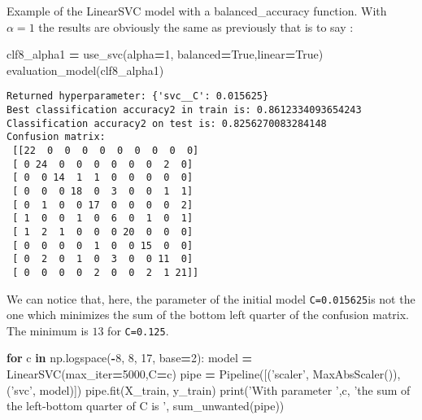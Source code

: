 \documentclass[10pt,a4paper]{article}
\newenvironment{Shaded}{\begin{snugshade}}{\end{snugshade}}
\newcommand{\BuiltInTok}[1]{#1}
\newcommand{\ControlFlowTok}[1]{\textcolor[rgb]{0.13,0.29,0.53}{\textbf{#1}}}
\newcommand{\DecValTok}[1]{\textcolor[rgb]{0.00,0.00,0.81}{#1}}
\newcommand{\KeywordTok}[1]{\textcolor[rgb]{0.13,0.29,0.53}{\textbf{#1}}}
\newcommand{\NormalTok}[1]{#1}
\newcommand{\OperatorTok}[1]{\textcolor[rgb]{0.81,0.36,0.00}{\textbf{#1}}}
\newcommand{\StringTok}[1]{\textcolor[rgb]{0.31,0.60,0.02}{#1}}
\newcommand{\VariableTok}[1]{\textcolor[rgb]{0.00,0.00,0.00}{#1}}
\theoremstyle{break}
\begin{document}
Example of the LinearSVC model with a balanced\_accuracy function. With \(\alpha = 1\) the results are obviously the same as previously that is to say :

\begin{Shaded}
\begin{Highlighting}[]
\NormalTok{clf8_alpha1 }\OperatorTok{=}\NormalTok{ use_svc(alpha}\OperatorTok{=}\DecValTok{1}\NormalTok{, balanced}\OperatorTok{=}\VariableTok{True}\NormalTok{,linear}\OperatorTok{=}\VariableTok{True}\NormalTok{)}
\NormalTok{evaluation_model(clf8_alpha1)}
\end{Highlighting}
\end{Shaded}

\begin{verbatim}
Returned hyperparameter: {'svc__C': 0.015625}
Best classification accuracy2 in train is: 0.8612334093654243
Classification accuracy2 on test is: 0.8256270083284148
Confusion matrix: 
 [[22  0  0  0  0  0  0  0  0  0]
 [ 0 24  0  0  0  0  0  0  2  0]
 [ 0  0 14  1  1  0  0  0  0  0]
 [ 0  0  0 18  0  3  0  0  1  1]
 [ 0  1  0  0 17  0  0  0  0  2]
 [ 1  0  0  1  0  6  0  1  0  1]
 [ 1  2  1  0  0  0 20  0  0  0]
 [ 0  0  0  0  1  0  0 15  0  0]
 [ 0  2  0  1  0  3  0  0 11  0]
 [ 0  0  0  0  2  0  0  2  1 21]]
\end{verbatim}

We can notice that, here, the parameter of the initial model \texttt{C=0.015625}is not the one which minimizes the sum of the bottom left quarter of the confusion matrix. The minimum is \(13\) for \texttt{C=0.125}.

\begin{Shaded}
\begin{Highlighting}[]
\ControlFlowTok{for}\NormalTok{ c }\KeywordTok{in}\NormalTok{ np.logspace(}\OperatorTok{-}\DecValTok{8}\NormalTok{, }\DecValTok{8}\NormalTok{, }\DecValTok{17}\NormalTok{, base}\OperatorTok{=}\DecValTok{2}\NormalTok{):}
\NormalTok{    model }\OperatorTok{=}\NormalTok{ LinearSVC(max_iter}\OperatorTok{=}\DecValTok{5000}\NormalTok{,C}\OperatorTok{=}\NormalTok{c)}
\NormalTok{    pipe }\OperatorTok{=}\NormalTok{ Pipeline([(}\StringTok{'scaler'}\NormalTok{, MaxAbsScaler()), (}\StringTok{'svc'}\NormalTok{, model)])}
\NormalTok{    pipe.fit(X_train, y_train)}
    \BuiltInTok{print}\NormalTok{(}\StringTok{'With parameter '}\NormalTok{,c, }\StringTok{'the sum of the left-bottom quarter of C is '}\NormalTok{, sum_unwanted(pipe))}
\end{Highlighting}
\end{Shaded}
\end{document}
